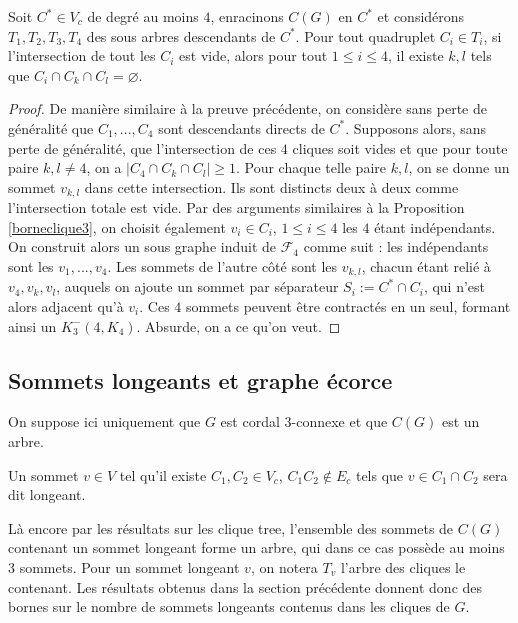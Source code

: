 \documentclass{scrartcl}
\begin{document}
\begin{flushleft}
\begin{prop}\label{borneclique4}
    Soit $C^* \in V_c$ de degré au moins $4$, enracinons $C(G)$ en $C^*$ et considérons
    $T_1, T_2, T_3, T_4$ des sous arbres descendants de $C^*$. Pour tout quadruplet
    $C_i \in T_i$, si l'intersection de tout les $C_i$ est vide, alors pour tout
    $1 \leq i \leq 4$, il existe $k,l$ tels que $C_i \cap C_k \cap C_l = \varnothing$.
\end{prop}

\begin{proof}
    De manière similaire à la preuve précédente, on considère sans perte de généralité
    que $C_1, ..., C_4$ sont descendants directs de $C^*$. Supposons alors, sans perte
    de généralité, que l'intersection de ces $4$ cliques soit vides et que pour toute paire
    $k,l \neq 4$, on a $|C_4 \cap C_k \cap C_l| \geq 1$. Pour chaque telle paire $k,l$, on
    se donne un sommet $v_{k,l}$ dans cette intersection. Ils sont distincts deux à deux
    comme l'intersection totale est vide. Par des arguments similaires à la Proposition
    \ref{borneclique3}, on choisit également $v_i \in C_i$, $1 \leq i \leq 4$ les $4$
    étant indépendants.
    \medskip \newline
    On construit alors un sous graphe induit de $\mathcal{F}_4$ comme suit : les indépendants
    sont les $v_1, ..., v_4$. Les sommets de l'autre côté sont les $v_{k,l}$, chacun
    étant relié à $v_4, v_k, v_l$, auquels on ajoute un sommet par séparateur $S_i := C^* \cap C_i$,
    qui n'est alors adjacent qu'à $v_i$. Ces $4$ sommets peuvent être contractés en un seul,
    formant ainsi un $K^-_3(4, K_4)$. Absurde, on a ce qu'on veut.
\end{proof}

\subsection{Sommets longeants et graphe écorce}

On suppose ici uniquement que $G$ est cordal $3$-connexe et que $C(G)$ est un arbre.

\begin{def*}
    Un sommet $v \in V$ tel qu'il existe $C_1, C_2 \in V_c$, $C_1C_2 \notin E_c$ tels que
    $v \in C_1 \cap C_2$ sera dit longeant.
\end{def*}

Là encore par les résultats sur les clique tree, l'ensemble des sommets de $C(G)$ contenant
un sommet longeant forme un arbre, qui dans ce cas possède au moins $3$ sommets. Pour un sommet
longeant $v$, on notera $T_v$ l'arbre des cliques le contenant. Les
résultats obtenus dans la section précédente donnent donc des bornes sur le nombre de sommets
longeants contenus dans les cliques de $G$.


\end{flushleft}
\end{document}
